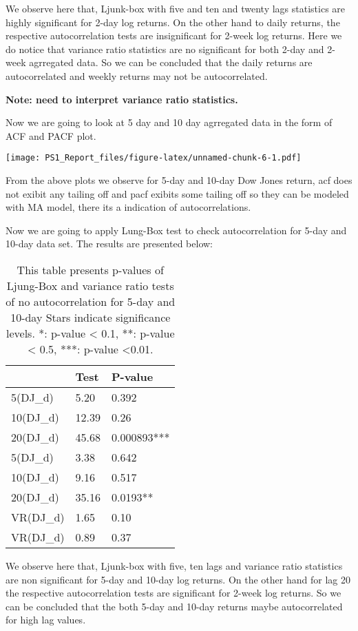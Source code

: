 \documentclass[
]{article}
\begin{document}
We observe here that, Ljunk-box with five and ten and twenty lags
statistics are highly significant for 2-day log returns. On the other
hand to daily returns, the respective autocorrelation tests are
insignificant for 2-week log returns. Here we do notice that variance
ratio statistics are no significant for both 2-day and 2-week agrregated
data. So we can be concluded that the daily returns are autocorrelated
and weekly returns may not be autocorrelated.

\textbf{Note: need to interpret variance ratio statistics.}

Now we are going to look at 5 day and 10 day agrregated data in the form
of ACF and PACF plot.

\texttt{[image: PS1\_Report\_files/figure-latex/unnamed-chunk-6-1.pdf]}

From the above plots we observe for 5-day and 10-day Dow Jones return,
acf does not exibit any tailing off and pacf exibits some tailing off so
they can be modeled with MA model, there its a indication of
autocorrelations.

Now we are going to apply Lung-Box test to check autocorrelation for
5-day and 10-day data set. The results are presented below:

\begin{table}

\caption{\label{tab:unnamed-chunk-7}This table presents p-values of Ljung-Box and variance ratio tests of no autocorrelation for 5-day and 10-day Stars indicate significance levels. *: p-value < 0.1, **: p-value < 0.5, ***: p-value <0.01.}
\centering
\begin{tabular}[t]{l|l|l}
\hline
  & Test & P-value\\
\hline
5(DJ\_d) & 5.20 & 0.392\\
\hline
10(DJ\_d) & 12.39 & 0.26\\
\hline
20(DJ\_d) & 45.68 & 0.000893***\\
\hline
5(DJ\_d) & 3.38 & 0.642\\
\hline
10(DJ\_d) & 9.16 & 0.517\\
\hline
20(DJ\_d) & 35.16 & 0.0193**\\
\hline
VR(DJ\_d) & 1.65 & 0.10\\
\hline
VR(DJ\_d) & 0.89 & 0.37\\
\hline
\end{tabular}
\end{table}

We observe here that, Ljunk-box with five, ten lags and variance ratio
statistics are non significant for 5-day and 10-day log returns. On the
other hand for lag 20 the respective autocorrelation tests are
significant for 2-week log returns. So we can be concluded that the both
5-day and 10-day returns maybe autocorrelated for high lag values.
\end{document}
